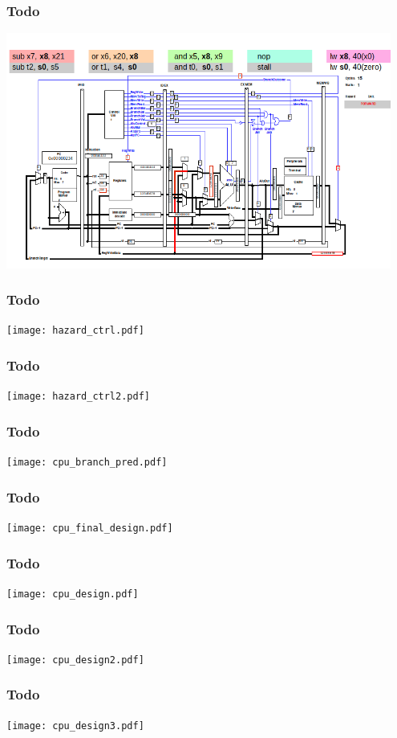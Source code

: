 \documentclass{beamer}
\begin{document}
\begin{frame}
\frametitle{Todo}
\includegraphics[width=0.95\textwidth]{fig/hazard-stall-qtrvsim4.png}
\end{frame}

\begin{frame}
\frametitle{Todo}
\texttt{[image: hazard\_ctrl.pdf]}
\end{frame}

\begin{frame}
\frametitle{Todo}
\texttt{[image: hazard\_ctrl2.pdf]}
\end{frame}

\begin{frame}
\frametitle{Todo}
\texttt{[image: cpu\_branch\_pred.pdf]}
\end{frame}

\begin{frame}
\frametitle{Todo}
\texttt{[image: cpu\_final\_design.pdf]}
\end{frame}

\begin{frame}
\frametitle{Todo}
\texttt{[image: cpu\_design.pdf]}
\end{frame}

\begin{frame}
\frametitle{Todo}
\texttt{[image: cpu\_design2.pdf]}
\end{frame}

\begin{frame}
\frametitle{Todo}
\texttt{[image: cpu\_design3.pdf]}
\end{frame}
\end{document}
